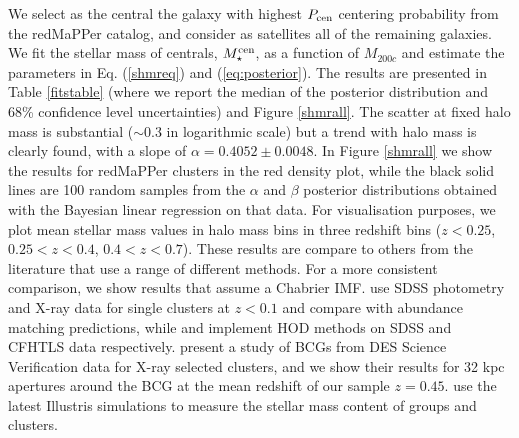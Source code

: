 {We select as the central the galaxy with highest $P_{\rm cen}$ centering probability from the redMaPPer catalog, and consider as satellites all of the remaining galaxies. We fit the stellar mass of centrals, $M_\star^{\rm cen}$, as a function of $M_{200c}$ and estimate the parameters in Eq. (\ref{shmreq}) and (\ref{eq:posterior}). The results are presented in Table \ref{fitstable} (where we report the median of the posterior distribution and 68\% confidence level uncertainties) and Figure \ref{shmrall}. The scatter at fixed halo mass is substantial ($\sim 0.3$ in logarithmic scale) but a trend with halo mass is clearly found, with a slope of $\alpha=0.4052\pm 0.0048$. 
In Figure \ref{shmrall} we show the results for redMaPPer clusters in the red density plot, while the black solid lines are 100 random samples from the $\alpha$ and $\beta$ posterior distributions obtained with the Bayesian linear regression on that data. For visualisation purposes, we plot mean stellar mass values in halo mass bins in three redshift bins ($z<0.25$, $0.25<z<0.4$, $0.4<z<0.7$). These results are compare to others from the literature that use a range of different methods. For a more consistent comparison, we show results that assume a Chabrier IMF. \citet{kravtsov} use SDSS photometry and X-ray data for single clusters at $z<0.1$ and compare with abundance matching predictions, while \citet{zu} and \citet{coupon} implement HOD methods on SDSS and CFHTLS data respectively. \citet{zhangbcg} present a study of BCGs from DES Science Verification data for X-ray selected clusters, and we show their results for 32 kpc apertures around the BCG at the mean redshift of our sample $z=0.45$. \citet{illustris} use the latest Illustris simulations to measure the stellar mass content of groups and clusters.

}
